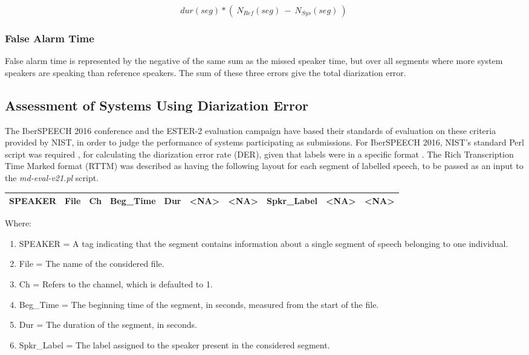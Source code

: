 \singlespacing
$$ dur(seg) * (\  N_{Ref}(seg)\ -\ N_{Sys}(seg)\ )\ $$

\subsubsection{False Alarm Time}

\doublespacing
False alarm time is represented by the negative of the same sum as the missed speaker time, but over all segments where more system speakers are speaking than reference speakers. The sum of these three errors give the total diarization error.

\subsection{Assessment of Systems Using Diarization Error}

\doublespacing
The IberSPEECH 2016 conference \cite{ortega2016albayzin} and the ESTER-2 evaluation campaign \cite{galliano2009ester} have based their standards of evaluation on these criteria provided by NIST, in order to judge the performance of systems participating as submissions. For IberSPEECH 2016, NIST's standard Perl script was required \cite{NIST2006web}, for calculating the diarization error rate (DER), given that labels were in a specific format \cite{ortega2016albayzin}. The Rich Transcription Time Marked format (RTTM) was described as having the following layout for each segment of labelled speech, to be passed as an input to the \emph{md-eval-v21.pl} script. \par

\bgroup
\singlespacing
\def\arraystretch{1.5}
\begin{center}
\begin{tabular}{| c | c | c | c | c | c | c | c | c | c |}
\hline
 SPEAKER & File & Ch & Beg\_Time & Dur & {\small <NA>} & {\small <NA>} & Spkr\_Label & {\small <NA>} & {\small <NA>} \\
\hline
\end{tabular}
\end{center}
\egroup

\doublespacing
\noindent Where:

\begin{enumerate}
\singlespacing
\item{SPEAKER = A tag indicating that the segment contains information about a single segment of speech belonging to one individual.}
\item{File = The name of the considered file.}
\item{Ch = Refers to the channel, which is defaulted to 1.}
\item{Beg\_Time = The beginning time of the segment, in seconds, measured from the start of the file.}
\item{Dur = The duration of the segment, in seconds.}
\item{Spkr\_Label = The label assigned to the speaker present in the considered segment.}
\end{enumerate}

